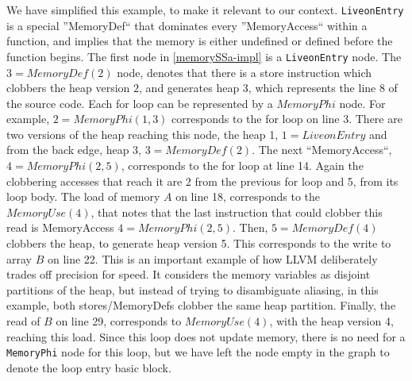We have simplified this example, to make it relevant to our context. 
\texttt{LiveonEntry} is a special ''MemoryDef`` that dominates every ''MemoryAccess`` within a function, 
and implies that the memory is either undefined or defined before the function begins. The first node in \autoref{memorySSa-impl} is a
 \texttt{LiveonEntry} node.
The $3=MemoryDef(2)$ node, 
denotes that there is a store instruction which clobbers the heap version 
$2$, and generates heap $3$, which represents the line 8 of the source code.
Each for loop can be represented by a $MemoryPhi$ node.
For example, $2=MemoryPhi(1,3)$ corresponds to the for loop on 
line 3. There are two versions of the heap reaching this node, the heap 1, 
$1 = LiveonEntry$ and from the back edge, heap 3, $3=MemoryDef(2)$.
The next ``MemoryAccess``, 
$4=MemoryPhi(2,5)$, corresponds to the for loop at line 14. Again the clobbering accesses that reach it are 2 from the previous for loop and 5, from its loop body. 
The load of memory $A$ on line 18, corresponds to the $MemoryUse(4)$, that notes that the last instruction that could clobber this read is MemoryAccess $4=MemoryPhi(2,5)$. 
Then,  $5=MemoryDef(4)$ clobbers the heap, 
to generate heap version 5. This corresponds to the write to 
array $B$ on line 22. 
This is an important example of how LLVM deliberately trades off 
precision for speed. It considers the memory variables as disjoint partitions of the heap, but instead of trying to disambiguate aliasing, 
in this example, both stores/MemoryDefs clobber 
the same heap partition. 
Finally, the read of $B$ on line 29, corresponds to $MemoryUse(4)$,
with the heap version 4, reaching this load. Since this 
loop does not update memory, there is no need for a 
\texttt{MemoryPhi} node for this loop, but we have left
the node empty in the graph to denote the loop entry basic block.

